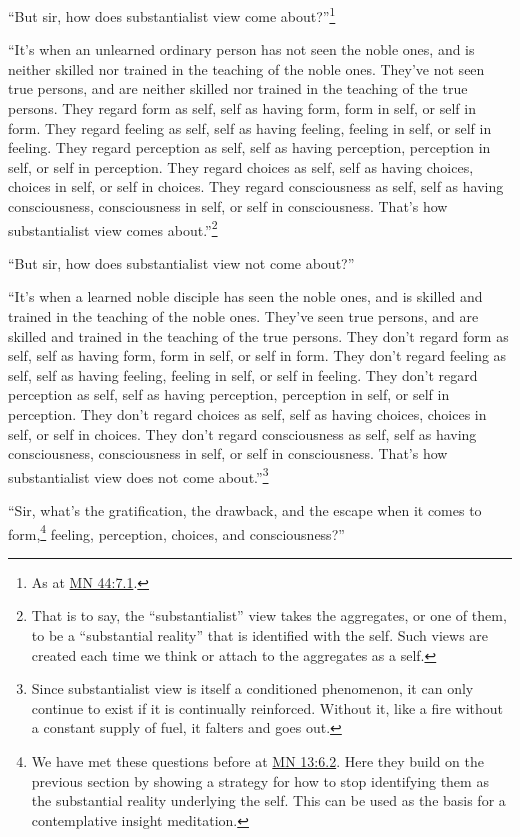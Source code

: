 \documentclass[12pt,openany]{book}%
\begin{document}
“But sir, how does substantialist view come about?”\footnote{As at \href{https://suttacentral.net/mn44/en/sujato\#7.1}{MN 44:7.1}. } 

“It’s when an unlearned ordinary person has not seen the noble ones, and is neither skilled nor trained in the teaching of the noble ones. They’ve not seen true persons, and are neither skilled nor trained in the teaching of the true persons. They regard form as self, self as having form, form in self, or self in form. They regard feeling as self, self as having feeling, feeling in self, or self in feeling. They regard perception as self, self as having perception, perception in self, or self in perception. They regard choices as self, self as having choices, choices in self, or self in choices. They regard consciousness as self, self as having consciousness, consciousness in self, or self in consciousness. That’s how substantialist view comes about.”\footnote{That is to say, the “substantialist” view takes the aggregates, or one of them, to be a “substantial reality” that is identified with the self. Such views are created each time we think or attach to the aggregates as a self. } 

“But sir, how does substantialist view not come about?” 

“It’s when a learned noble disciple has seen the noble ones, and is skilled and trained in the teaching of the noble ones. They’ve seen true persons, and are skilled and trained in the teaching of the true persons. They don’t regard form as self, self as having form, form in self, or self in form. They don’t regard feeling as self, self as having feeling, feeling in self, or self in feeling. They don’t regard perception as self, self as having perception, perception in self, or self in perception. They don’t regard choices as self, self as having choices, choices in self, or self in choices. They don’t regard consciousness as self, self as having consciousness, consciousness in self, or self in consciousness. That’s how substantialist view does not come about.”\footnote{Since substantialist view is itself a conditioned phenomenon, it can only continue to exist if it is continually reinforced. Without it, like a fire without a constant supply of fuel, it falters and goes out. } 

“Sir, what’s the gratification, the drawback, and the escape when it comes to form,\footnote{We have met these questions before at \href{https://suttacentral.net/mn13/en/sujato\#6.2}{MN 13:6.2}. Here they build on the previous section by showing a strategy for how to stop identifying them as the substantial reality underlying the self. This can be used as the basis for a contemplative insight meditation. } feeling, perception, choices, and consciousness?” 
\end{document}

